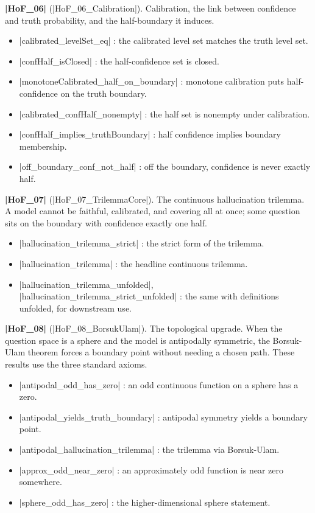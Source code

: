 \documentclass{memoir}
\begin{document}
\textbf{\LeanVerb|HoF_06|} (\LeanVerb|HoF_06_Calibration|). Calibration, the link between confidence and
truth probability, and the half-boundary it induces.

\begin{itemize}
\item \LeanVerb|calibrated_levelSet_eq| : the calibrated level set matches the truth level set.
\item \LeanVerb|confHalf_isClosed| : the half-confidence set is closed.
\item \LeanVerb|monotoneCalibrated_half_on_boundary| : monotone calibration puts half-confidence
   on the truth boundary.
\item \LeanVerb|calibrated_confHalf_nonempty| : the half set is nonempty under calibration.
\item \LeanVerb|confHalf_implies_truthBoundary| : half confidence implies boundary membership.
\item \LeanVerb|off_boundary_conf_not_half| : off the boundary, confidence is never exactly
   half.

\end{itemize}


\textbf{\LeanVerb|HoF_07|} (\LeanVerb|HoF_07_TrilemmaCore|). The continuous hallucination trilemma. A model
cannot be faithful, calibrated, and covering all at once; some question sits on the
boundary with confidence exactly one half.

\begin{itemize}
\item \LeanVerb|hallucination_trilemma_strict| : the strict form of the trilemma.
\item \LeanVerb|hallucination_trilemma| : the headline continuous trilemma.
\item \LeanVerb|hallucination_trilemma_unfolded|, \LeanVerb|hallucination_trilemma_strict_unfolded| : the
   same with definitions unfolded, for downstream use.

\end{itemize}


\textbf{\LeanVerb|HoF_08|} (\LeanVerb|HoF_08_BorsukUlam|). The topological upgrade. When the question space
is a sphere and the model is antipodally symmetric, the Borsuk-Ulam theorem forces a
boundary point without needing a chosen path. These results use the three standard
axioms.

\begin{itemize}
\item \LeanVerb|antipodal_odd_has_zero| : an odd continuous function on a sphere has a zero.
\item \LeanVerb|antipodal_yields_truth_boundary| : antipodal symmetry yields a boundary point.
\item \LeanVerb|antipodal_hallucination_trilemma| : the trilemma via Borsuk-Ulam.
\item \LeanVerb|approx_odd_near_zero| : an approximately odd function is near zero somewhere.
\item \LeanVerb|sphere_odd_has_zero| : the higher-dimensional sphere statement.

\end{itemize}
\end{document}
